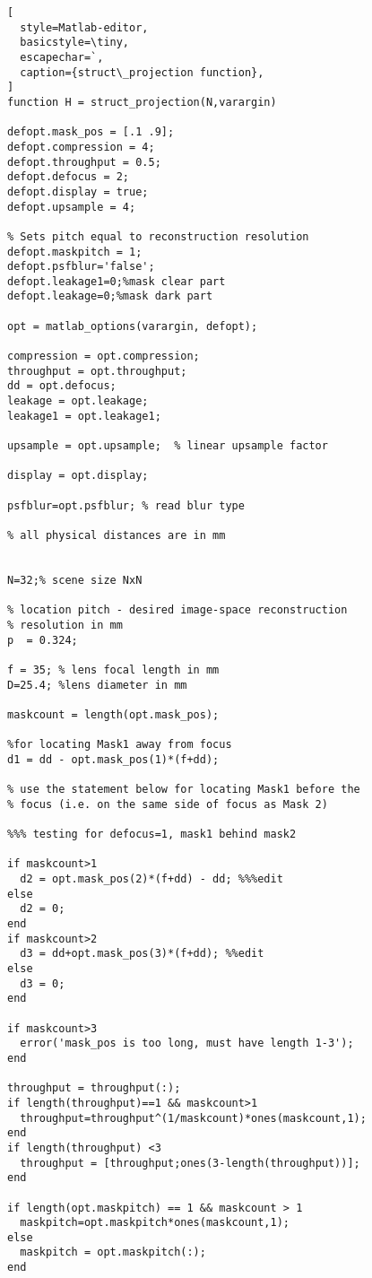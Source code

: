 \begin{lstlisting}[
  style=Matlab-editor,
  basicstyle=\tiny,
  escapechar=`,
  caption={struct\_projection function},
]
function H = struct_projection(N,varargin)

defopt.mask_pos = [.1 .9];
defopt.compression = 4;
defopt.throughput = 0.5;
defopt.defocus = 2;
defopt.display = true;
defopt.upsample = 4;

% Sets pitch equal to reconstruction resolution
defopt.maskpitch = 1; 
defopt.psfblur='false';
defopt.leakage1=0;%mask clear part
defopt.leakage=0;%mask dark part

opt = matlab_options(varargin, defopt);

compression = opt.compression;
throughput = opt.throughput;
dd = opt.defocus;
leakage = opt.leakage;
leakage1 = opt.leakage1;

upsample = opt.upsample;  % linear upsample factor

display = opt.display;

psfblur=opt.psfblur; % read blur type

% all physical distances are in mm


N=32;% scene size NxN

% location pitch - desired image-space reconstruction 
% resolution in mm
p  = 0.324;  

f = 35; % lens focal length in mm
D=25.4; %lens diameter in mm

maskcount = length(opt.mask_pos);

%for locating Mask1 away from focus
d1 = dd - opt.mask_pos(1)*(f+dd); 

% use the statement below for locating Mask1 before the 
% focus (i.e. on the same side of focus as Mask 2)

%%% testing for defocus=1, mask1 behind mask2

if maskcount>1
  d2 = opt.mask_pos(2)*(f+dd) - dd; %%%edit
else
  d2 = 0;
end
if maskcount>2
  d3 = dd+opt.mask_pos(3)*(f+dd); %%edit
else
  d3 = 0;
end

if maskcount>3
  error('mask_pos is too long, must have length 1-3');
end

throughput = throughput(:);
if length(throughput)==1 && maskcount>1
  throughput=throughput^(1/maskcount)*ones(maskcount,1);
end
if length(throughput) <3
  throughput = [throughput;ones(3-length(throughput))];
end

if length(opt.maskpitch) == 1 && maskcount > 1
  maskpitch=opt.maskpitch*ones(maskcount,1);
else
  maskpitch = opt.maskpitch(:);
end


\end{lstlisting}
